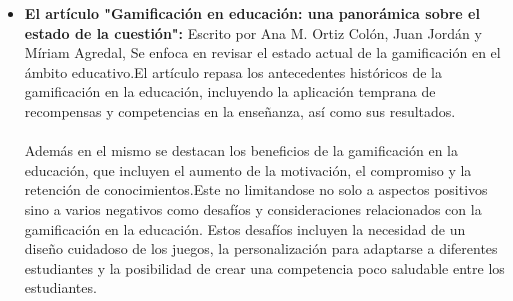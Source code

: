 \begin{itemize}
    \item \textbf{El artículo "Gamificación en educación: una panorámica sobre el estado de la cuestión":} Escrito por Ana M. Ortiz Colón, Juan Jordán y Míriam Agredal, Se enfoca en revisar el estado actual de la gamificación en el ámbito educativo.El artículo repasa los antecedentes históricos de la gamificación en la educación, incluyendo la aplicación temprana de recompensas y competencias en la enseñanza, así como sus resultados. 
    \\ \\
Además en el mismo se destacan los beneficios de la gamificación en la educación, que incluyen el aumento de la motivación, el compromiso y la retención de conocimientos.Este no limitandose no solo a aspectos positivos sino a varios negativos como desafíos y consideraciones relacionados con la gamificación en la educación. Estos desafíos incluyen la necesidad de un diseño cuidadoso de los juegos, la personalización para adaptarse a diferentes estudiantes y la posibilidad de crear una competencia poco saludable entre los estudiantes.\cite{n}

\end{itemize}


